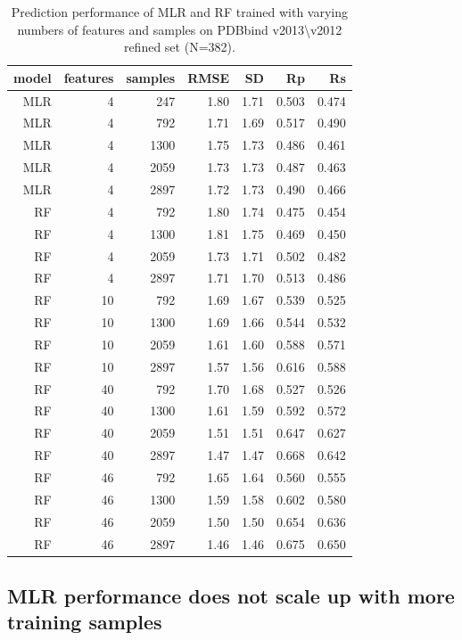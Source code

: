 \documentclass[journal=jacsat,manuscript=article]{achemso}
\begin{document}
\begin{table}
\caption{Prediction performance of MLR and RF trained with varying numbers of features and samples on PDBbind v2013\textbackslash v2012 refined set (N=382).}
\label{tbl:tst382}
\begin{tabular}{rrrrrrr}
\hline
model & features & samples & RMSE & SD & Rp & Rs\\
\hline
MLR &  4 &  247 & 1.80 & 1.71 & 0.503 & 0.474\\
MLR &  4 &  792 & 1.71 & 1.69 & 0.517 & 0.490\\
MLR &  4 & 1300 & 1.75 & 1.73 & 0.486 & 0.461\\
MLR &  4 & 2059 & 1.73 & 1.73 & 0.487 & 0.463\\
MLR &  4 & 2897 & 1.72 & 1.73 & 0.490 & 0.466\\
 RF &  4 &  792 & 1.80 & 1.74 & 0.475 & 0.454\\
 RF &  4 & 1300 & 1.81 & 1.75 & 0.469 & 0.450\\
 RF &  4 & 2059 & 1.73 & 1.71 & 0.502 & 0.482\\
 RF &  4 & 2897 & 1.71 & 1.70 & 0.513 & 0.486\\
 RF & 10 &  792 & 1.69 & 1.67 & 0.539 & 0.525\\
 RF & 10 & 1300 & 1.69 & 1.66 & 0.544 & 0.532\\
 RF & 10 & 2059 & 1.61 & 1.60 & 0.588 & 0.571\\
 RF & 10 & 2897 & 1.57 & 1.56 & 0.616 & 0.588\\
 RF & 40 &  792 & 1.70 & 1.68 & 0.527 & 0.526\\
 RF & 40 & 1300 & 1.61 & 1.59 & 0.592 & 0.572\\
 RF & 40 & 2059 & 1.51 & 1.51 & 0.647 & 0.627\\
 RF & 40 & 2897 & 1.47 & 1.47 & 0.668 & 0.642\\
 RF & 46 &  792 & 1.65 & 1.64 & 0.560 & 0.555\\
 RF & 46 & 1300 & 1.59 & 1.58 & 0.602 & 0.580\\
 RF & 46 & 2059 & 1.50 & 1.50 & 0.654 & 0.636\\
 RF & 46 & 2897 & 1.46 & 1.46 & 0.675 & 0.650\\
\hline
\end{tabular}
\end{table}

\subsection{MLR performance does not scale up with more training samples}
\end{document}
